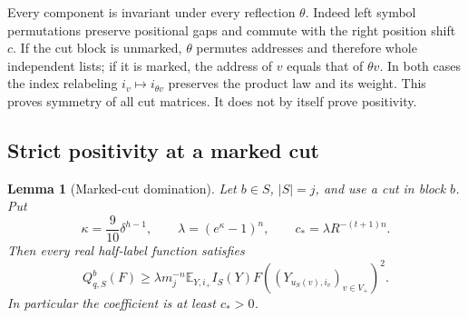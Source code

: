 \documentclass[11pt,a4paper]{article}
\numberwithin{equation}{section}
\newtheorem{lemma}[theorem]{Lemma}
\theoremstyle{definition}
\theoremstyle{remark}
\newcommand{\E}{\mathbb E}
\begin{document}
Every component is invariant under every reflection $\theta$.
Indeed left symbol permutations preserve positional gaps and commute
with the right position shift $c$. If the cut block is unmarked,
$\theta$ permutes addresses and therefore whole independent lists;
if it is marked, the address of $v$ equals that of $\theta v$.
In both cases the index relabeling $i_v\mapsto i_{\theta v}$ preserves
the product law and its weight. This proves symmetry of all cut
matrices. It does not by itself prove positivity.

\subsection{Strict positivity at a marked cut}

\begin{lemma}[Marked-cut domination]
\label{lem:marked}
Let $b\in S$, $|S|=j$, and use a cut in block $b$. Put
\[
 \kappa=\frac9{10}\delta^{h-1},\qquad
 \lambda=(e^\kappa-1)^n,\qquad
 c_* =\lambda R^{-(t+1)n}.
\]
Then every real half-label function satisfies
\begin{equation}
 Q_{q,S}^b(F)
 \ge\lambda m_j^{-n}\E_{Y,i_+}I_S(Y)
           F((Y_{u_S(v),i_v})_{v\in V_+})^2.
 \label{eq:marked}
\end{equation}
In particular the coefficient is at least $c_*>0$.
\end{lemma}
\end{document}
